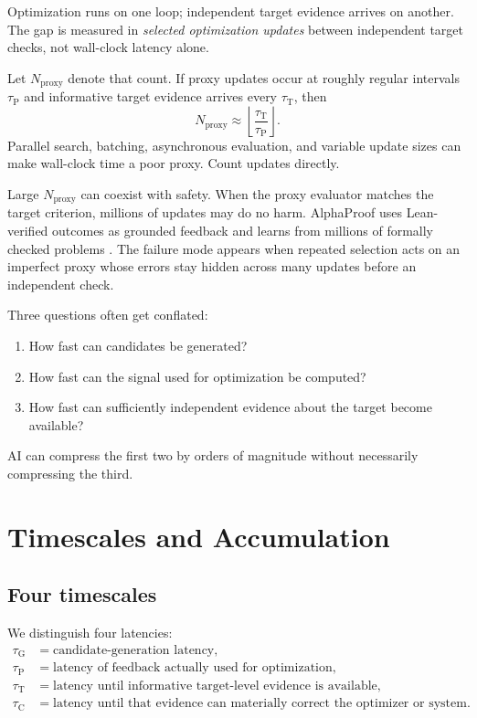 \documentclass[11pt]{article}
\newcommand{\tauG}{\tau_{\mathrm{G}}}
\newcommand{\tauP}{\tau_{\mathrm{P}}}
\newcommand{\tauT}{\tau_{\mathrm{T}}}
\newcommand{\tauC}{\tau_{\mathrm{C}}}
\newcommand{\Nproxy}{N_{\mathrm{proxy}}}
\begin{document}
Optimization runs on one loop; independent target evidence arrives on another. The gap is measured in \emph{selected optimization updates} between independent target checks, not wall-clock latency alone.

Let \(\Nproxy\) denote that count. If proxy updates occur at roughly regular intervals \(\tauP\) and informative target evidence arrives every \(\tauT\), then
\begin{equation}
\Nproxy \approx \left\lfloor \frac{\tauT}{\tauP} \right\rfloor.
\label{eq:Nproxy-ratio}
\end{equation}
Parallel search, batching, asynchronous evaluation, and variable update sizes can make wall-clock time a poor proxy. Count updates directly.

Large \(\Nproxy\) can coexist with safety. When the proxy evaluator matches the target criterion, millions of updates may do no harm. AlphaProof uses Lean-verified outcomes as grounded feedback and learns from millions of formally checked problems \parencite{hubert2025alphaproof}. The failure mode appears when repeated selection acts on an imperfect proxy whose errors stay hidden across many updates before an independent check.

Three questions often get conflated:
\begin{enumerate}[label=(\roman*),leftmargin=*]
    \item How fast can candidates be generated?
    \item How fast can the signal used for optimization be computed?
    \item How fast can sufficiently independent evidence about the target become available?
\end{enumerate}
AI can compress the first two by orders of magnitude without necessarily compressing the third.

\section{Timescales and Accumulation}

\subsection{Four timescales}

We distinguish four latencies:
\begin{align}
\tauG &= \text{candidate-generation latency},\\
\tauP &= \text{latency of feedback actually used for optimization},\\
\tauT &= \text{latency until informative target-level evidence is available},\\
\tauC &= \text{latency until that evidence can materially correct the optimizer or system}.
\end{align}
\end{document}
